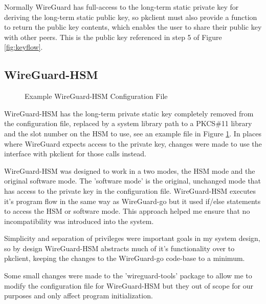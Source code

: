 \documentclass [11pt, proquest] {uwthesis}[2020/02/24]
\begin{document}
Normally WireGuard has full-access to the long-term static private key for deriving the long-term static public key, so pkclient must also provide a function to return the public key contents, which enables the user to share their public key with other peers. This is the public key referenced in step 5 of Figure \ref{fig:keyflow}.

\subsection{WireGuard-HSM}

\begin{figure}
\centering
{}
\caption{Example WireGuard-HSM Configuration File}
\label{fig:wg_hsm_config}
\end{figure}

WireGuard-HSM has the long-term private static key completely removed from the configuration file, replaced by a system library path to a PKCS\#11 library and the slot number on the HSM to use, see an example file in Figure \ref{fig:wg_hsm_config}.  In places where WireGuard expects access to the private key, changes were made to use the interface with pkclient for those calls instead.

WireGuard-HSM was designed to work in a two modes, the HSM mode and the original software mode. 
The 'software mode' is the original, unchanged mode that has access to the private key in the configuration file. WireGuard-HSM executes it's program flow in the same way as WireGuard-go but it used if/else statements to access the HSM or software mode. This approach helped me ensure that no incompatibility was introduced into the system. 

Simplicity and separation of privileges were important goals in my system design, so by design WireGuard-HSM abstracts much of it's functionality over to pkclient, keeping the changes to the WireGuard-go code-base to a minimum. 

Some small changes were made to the 'wireguard-tools' package to allow me to modify the configuration file for WireGuard-HSM but they out of scope for our purposes and only affect program initialization.
\end{document}
